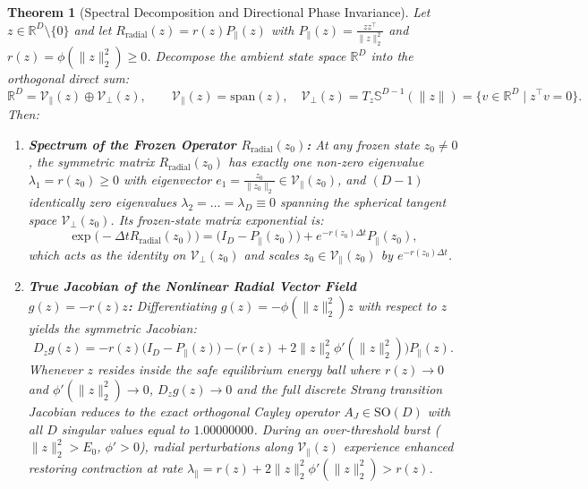 \documentclass[11pt,a4paper]{article}
\newtheorem{theorem}{Theorem}[section]
\begin{document}
\begin{theorem}[Spectral Decomposition and Directional Phase Invariance]
\label{thm:radial_isometry}
Let $z \in \mathbb{R}^D \setminus \{0\}$ and let $R_{\text{radial}}(z) = r(z) P_\parallel(z)$ with $P_\parallel(z) = \frac{z z^\top}{\|z\|_2^2}$ and $r(z) = \phi(\|z\|_2^2) \ge 0$. Decompose the ambient state space $\mathbb{R}^D$ into the orthogonal direct sum:
\begin{equation}
    \mathbb{R}^D = \mathcal{V}_\parallel(z) \oplus \mathcal{V}_\perp(z), \qquad \mathcal{V}_\parallel(z) = \mathrm{span}(z), \quad \mathcal{V}_\perp(z) = T_z \mathbb{S}^{D-1}(\|z\|) = \{v \in \mathbb{R}^D \mid z^\top v = 0\}.
\end{equation}
Then:
\begin{enumerate}
    \item \textbf{Spectrum of the Frozen Operator $R_{\text{radial}}(z_0)$:} At any frozen state $z_0 \neq 0$, the symmetric matrix $R_{\text{radial}}(z_0)$ has exactly one non-zero eigenvalue $\lambda_1 = r(z_0) \ge 0$ with eigenvector $e_1 = \frac{z_0}{\|z_0\|_2} \in \mathcal{V}_\parallel(z_0)$, and $(D-1)$ identically zero eigenvalues $\lambda_2 = \dots = \lambda_D \equiv 0$ spanning the spherical tangent space $\mathcal{V}_\perp(z_0)$. Its frozen-state matrix exponential is:
    \begin{equation}
        \exp\big(-\Delta t R_{\text{radial}}(z_0)\big) = \big(I_D - P_\parallel(z_0)\big) + e^{-r(z_0)\Delta t} P_\parallel(z_0),
        \label{eq:radial_exp_identity}
    \end{equation}
    which acts as the identity on $\mathcal{V}_\perp(z_0)$ and scales $z_0 \in \mathcal{V}_\parallel(z_0)$ by $e^{-r(z_0)\Delta t}$.
    \item \textbf{True Jacobian of the Nonlinear Radial Vector Field $g(z) = -r(z)z$:} Differentiating $g(z) = -\phi(\|z\|_2^2)z$ with respect to $z$ yields the symmetric Jacobian:
    \begin{equation}
        D_z g(z) = -r(z)\big(I_D - P_\parallel(z)\big) - \Big(r(z) + 2\|z\|_2^2 \phi'(\|z\|_2^2)\Big) P_\parallel(z).
        \label{eq:nonlinear_radial_jacobian}
    \end{equation}
    Whenever $z$ resides inside the safe equilibrium energy ball where $r(z) \to 0$ and $\phi'(\|z\|_2^2) \to 0$, $D_z g(z) \to 0$ and the full discrete Strang transition Jacobian reduces to the exact orthogonal Cayley operator $A_J \in \mathrm{SO}(D)$ with all $D$ singular values equal to $1.00000000$. During an over-threshold burst ($\|z\|_2^2 > E_0$, $\phi' > 0$), radial perturbations along $\mathcal{V}_\parallel(z)$ experience enhanced restoring contraction at rate $\lambda_\parallel = r(z) + 2\|z\|_2^2 \phi'(\|z\|_2^2) > r(z)$.

\end{enumerate}
\end{theorem}
\end{document}
